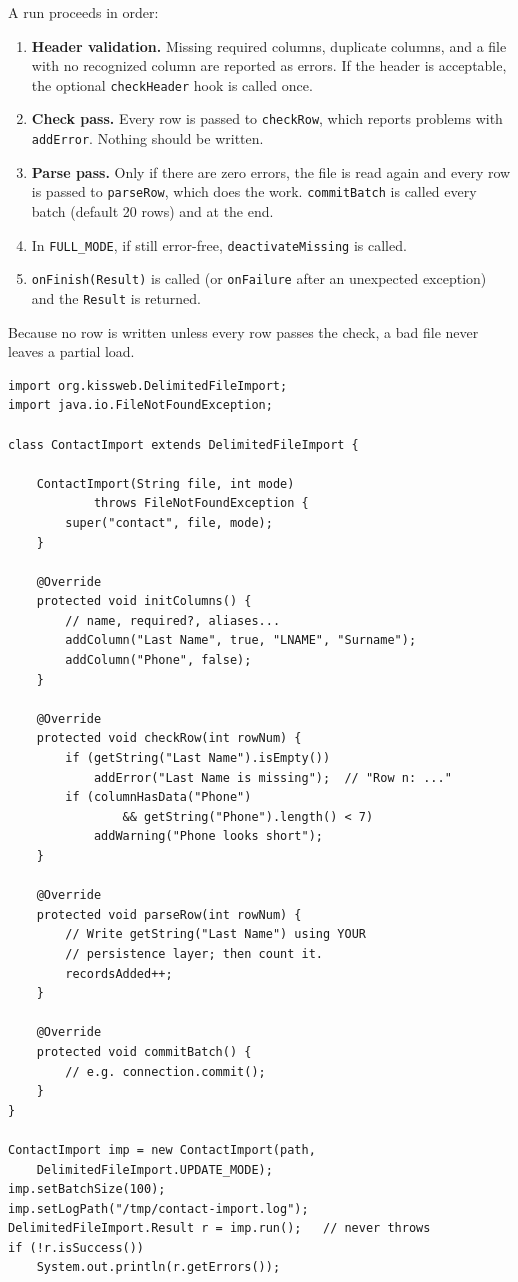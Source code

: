 A run proceeds in order:
\begin{enumerate}
\item \textbf{Header validation.}  Missing required columns, duplicate columns, and a file with no recognized column are reported as errors.  If the header is acceptable, the optional \texttt{checkHeader} hook is called once.
\item \textbf{Check pass.}  Every row is passed to \texttt{checkRow}, which reports problems with \texttt{addError}.  Nothing should be written.
\item \textbf{Parse pass.}  Only if there are zero errors, the file is read again and every row is passed to \texttt{parseRow}, which does the work.  \texttt{commitBatch} is called every batch (default 20 rows) and at the end.
\item In \texttt{FULL\_MODE}, if still error-free, \texttt{deactivateMissing} is called.
\item \texttt{onFinish(Result)} is called (or \texttt{onFailure} after an unexpected exception) and the \texttt{Result} is returned.
\end{enumerate}

Because no row is written unless every row passes the check, a bad file never leaves a partial load.

\begin{lstlisting}[style=java]
import org.kissweb.DelimitedFileImport;
import java.io.FileNotFoundException;

class ContactImport extends DelimitedFileImport {

    ContactImport(String file, int mode)
            throws FileNotFoundException {
        super("contact", file, mode);
    }

    @Override
    protected void initColumns() {
        // name, required?, aliases...
        addColumn("Last Name", true, "LNAME", "Surname");
        addColumn("Phone", false);
    }

    @Override
    protected void checkRow(int rowNum) {
        if (getString("Last Name").isEmpty())
            addError("Last Name is missing");  // "Row n: ..."
        if (columnHasData("Phone")
                && getString("Phone").length() < 7)
            addWarning("Phone looks short");
    }

    @Override
    protected void parseRow(int rowNum) {
        // Write getString("Last Name") using YOUR
        // persistence layer; then count it.
        recordsAdded++;
    }

    @Override
    protected void commitBatch() {
        // e.g. connection.commit();
    }
}

ContactImport imp = new ContactImport(path,
    DelimitedFileImport.UPDATE_MODE);
imp.setBatchSize(100);
imp.setLogPath("/tmp/contact-import.log");
DelimitedFileImport.Result r = imp.run();   // never throws
if (!r.isSuccess())
    System.out.println(r.getErrors());
\end{lstlisting}

